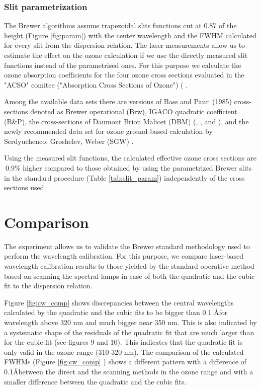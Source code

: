 \documentclass[acp, manuscript]{copernicus}
\begin{document}
\subsubsection{Slit parametrization }

The Brewer algorithms assume trapezoidal slits functions cut at 0.87 of the height (Figure \ref{fig:param}) with the  center wavelength and the FWHM calculated for every slit from the dispersion relation. The laser measurements allow us to estimate the effect on the ozone calculation if we use the directly measured slit functions instead of the parametrised ones. For this purpose we calculate the ozone absorption coefficients for the four ozone cross sections evaluated in the  "ACSO" comitee ("Absorption Cross Sections of Ozone") ( \citet{orphal2016absorption}.

Among the available data sets there are versions of Bass and Paur~(1985) cross-sections denoted as Brewer operational (Brw), IGACO quadratic coefficient (B\&P), the cross-sections of  Daumont Brion Malicet (DBM) (\citet{ daumont_ozone_1992}, \citet{brion_high-resolution_1993}, and \citet{malicet_ozone_1995} ), and the newly recommended data set for ozone ground-based calculation by Serdyuchenco, Groshelev, Weber (SGW) \citep{serdyuchenko_high_2012,gorshelev_high_2012,amt-9-4459-2016}. 


Using the measured slit functions, the calculated effective ozone cross sections are $~0.9\%$ higher compared to those obtained by using the parametrized Brewer slits in the standard procedure (Table \ref{tab:slit_param}) independently of the cross sections used.


\section{Comparison }

The experiment allows us to validate the Brewer standard methodology used to perform the wavelength calibration. For this purpose, we compare laser-based wavelength calibration results to those yielded by the standard operative method based on scanning the spectral lamps in case of both the quadratic and the cubic fit to the dispersion relation.

Figure \ref{fig:cw_comp} shows discrepancies between the central wavelengths calculated by the quadratic and the cubic fits to be bigger than 0.1 \AA for wavelength above 320 \unit{nm} and much bigger near 350 nm. This is  also indicated by a systematic shape of the residuals of the quadratic fit that are much larger than for the cubic fit (see figures 9 and 10). This indicates that the quadratic fit is only valid in the ozone range (310-320 nm). The comparison of the calculated FWHMs (Figure \ref{fig:cw_comp} ) shows a different pattern with a difference of 0.1\AA between the direct and the scanning methods in the ozone range and with a smaller difference between the quadratic and the cubic fits.  
\end{document}
